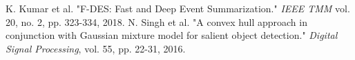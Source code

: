 \documentclass[journal]{IEEEtran}
\begin{document}
\begin{thebibliography}{1}
 K. Kumar et al. "F-DES: Fast and Deep Event Summarization." \emph{IEEE TMM} vol. 20, no. 2, pp. 323-334, 2018.
N. Singh et al. "A convex hull approach in conjunction with Gaussian mixture model for salient object detection." \emph{Digital Signal Processing}, vol. 55, pp. 22-31, 2016.



\end{thebibliography}
%













\end{document}

